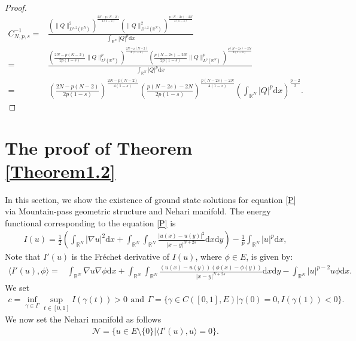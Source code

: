 \documentclass[12pt,a4paper,reqno]{amsart}
\numberwithin{equation}{section}
\begin{document}
\begin{proof}
\begin{equation*}
\begin{aligned}
C_{N,p,s}^{-1}
=&
\frac
{\left(
\|Q\|_{D^{s,2}(\mathbb{R}^{N})}^{2}
\right)
^{\frac{2N-p(N-2)}{4(1-s)}}
\left(
\|Q\|_{D^{1,2}(\mathbb{R}^{N})}^{2}
\right)
^{\frac{p(N-2s)-2N}{4(1-s)}}}
{\int_{\mathbb{R}^{N}}
|Q|^{p}
\mathrm{d}x}\\
=&
\frac
{\left(
\frac{2N-p(N-2)}{2p(1-s)}
\|Q\|_{L^{p}(\mathbb{R}^{N})}^{p}
\right)
^{\frac{2N-p(N-2)}{4(1-s)}}
\left(
\frac{p(N-2s)-2N}{2p(1-s)}
\|Q\|_{L^{p}(\mathbb{R}^{N})}^{p}
\right)
^{\frac{p(N-2s)-2N}{4(1-s)}}}
{\int_{\mathbb{R}^{N}}
|Q|^{p}
\mathrm{d}x}\\
=&
\left(
\frac{2N-p(N-2)}{2p(1-s)}
\right)
^{\frac{2N-p(N-2)}{4(1-s)}}
\left(
\frac{p(N-2s)-2N}{2p(1-s)}
\right)
^{\frac{p(N-2s)-2N}{4(1-s)}}
\left(
\int_{\mathbb{R}^{N}}
|Q|^{p}
\mathrm{d}x
\right)^{\frac{p-2}{2}}.
\end{aligned}
\end{equation*}
\end{proof}


\section{The proof of Theorem \ref{Theorem1.2}}
In this section, we show the existence of ground state solutions for equation \eqref{P} via Mountain-pass geometric structure and Nehari manifold.
The energy functional corresponding to the equation \eqref{P} is
\begin{equation*}
\begin{aligned}
I(u)=
\frac{1}{2}
\left(
\int_{\mathbb{R}^{N}}
|\nabla u|^{2}
\mathrm{d}x
+
\int_{\mathbb{R}^{N}}\int_{\mathbb{R}^{N}}\frac{|u(x)-u(y)|^{2}}{|x-y|^{N+2s}}
\mathrm{d}x\mathrm{d}y\right)
-
\frac{1}{p}
\int_{\mathbb{R}^{N}}
|u|^{p}
\mathrm{d}x,
\end{aligned}
\end{equation*}
Note that $I'(u)$ is the Fr\'{e}chet derivative of $I(u)$, where $\phi\in E$, is given by:
\begin{equation*}
\begin{aligned}
\langle I'(u),\phi\rangle
=&
\int_{\mathbb{R}^{N}}
\nabla u
\nabla \phi
\mathrm{d}x
+
\int_{\mathbb{R}^{N}}
\int_{\mathbb{R}^{N}}
\frac{(u(x)-u(y))(\phi(x)-\phi(y))}{|x-y|^{N+2s}}
\mathrm{d}x
\mathrm{d}y
-
\int_{\mathbb{R}^{N}}
|u|^{p-2}u\phi
\mathrm{d}x.
\end{aligned}
\end{equation*}
We set
\begin{equation*}
\begin{aligned}
c=\inf\limits_{\gamma\in \Gamma}\sup\limits_{t\in[0, 1]}I(\gamma (t))>0\,\ \text{and}\,\   \Gamma=\{\gamma\in C\left([0, 1], E\right)| \gamma(0)=0, I(\gamma (1))<0\}.
\end{aligned}
\end{equation*}
We now set the Nehari manifold as follows
\begin{equation*}
\begin{aligned}
\mathcal{N}=\{u\in E \setminus\{0\}|\langle I'(u),u\rangle=0\}.
\end{aligned}
\end{equation*}
\end{document}
